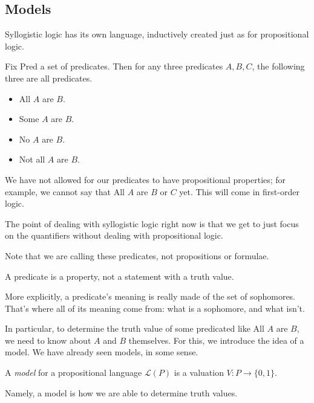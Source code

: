 \subsection{Models}
Syllogistic logic has its own language, inductively created just as for propositional logic.
\begin{defi}
	Fix $\mathrm{Pred}$ a set of predicates. Then for any three predicates $A,B,C$, the following three are all predicates.
	\begin{itemize}
		\item \textrm{All $A$ are $B$}.
		\item \textrm{Some $A$ are $B$}.
		\item \textrm{No $A$ are $B$}.
		\item \textrm{Not all $A$ are $B$}.
	\end{itemize}
\end{defi}
\begin{remark}
	We have not allowed for our predicates to have propositional properties; for example, we cannot say that \textrm{All $A$ are $B$ or $C$} yet. This will come in first-order logic.
\end{remark}
\begin{remark}
	The point of dealing with syllogistic logic right now is that we get to just focus on the quantifiers without dealing with propositional logic.
\end{remark}
Note that we are calling these predicates, not propositions or formulae.
\begin{warn}
	A predicate is a property, not a statement with a truth value.
\end{warn}
More explicitly, a predicate's meaning is really made of the set of sophomores. That's where all of its meaning come from: what is a sophomore, and what isn't.

In particular, to determine the truth value of some predicated like \textrm{All $A$ are $B$}, we need to know about $A$ and $B$ themselves. For this, we introduce the idea of a model. We have already seen models, in some sense.
\begin{definition}[Model]
	A \textit{model} for a propositional language $\mathcal L(P)$ is a valuation $V:P\to\{0,1\}$.
\end{definition}
Namely, a model is how we are able to determine truth values.

